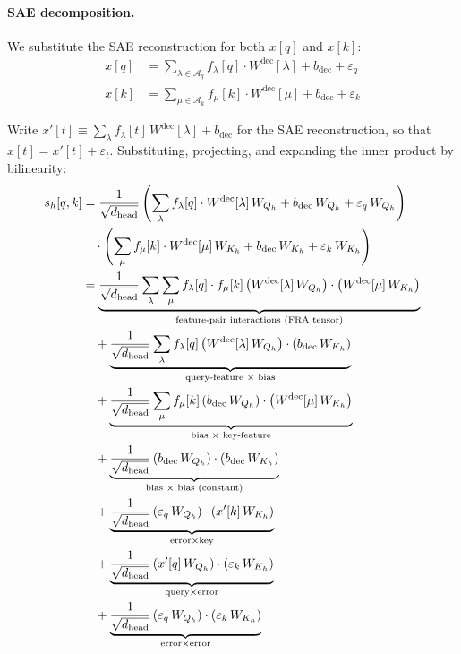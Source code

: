 \documentclass{article} %
\theoremstyle{plain}
\theoremstyle{definition}
\theoremstyle{remark}
\newcommand{\Wdec}{W^{\mathrm{dec}}}
\newcommand{\dhead}{d_{\mathrm{head}}}
\newcommand{\flambda}{f_\lambda}
\newcommand{\fmu}{f_\mu}
\begin{document}
\paragraph{SAE decomposition.} We substitute the SAE reconstruction for both $x[q]$ and $x[k]$:
\begin{align}
    x[q] &= \sum_{\lambda \in \mathcal{A}_q} \flambda[q] \cdot \Wdec[\lambda] + b_{\mathrm{dec}} + \varepsilon_q \\
    x[k] &= \sum_{\mu \in \mathcal{A}_k} \fmu[k] \cdot \Wdec[\mu] + b_{\mathrm{dec}} + \varepsilon_k
\end{align}

Write $x'[t] \equiv \sum_\lambda \flambda[t]\,\Wdec[\lambda] + b_{\mathrm{dec}}$ for the SAE reconstruction, so that $x[t] = x'[t] + \varepsilon_t$. Substituting, projecting, and expanding the inner product by bilinearity:
\begin{align}
    s_h[q,k] &= \frac{1}{\sqrt{\dhead}} \left( \sum_\lambda \flambda[q] \cdot \Wdec[\lambda]\,W_{Q_h} + b_{\mathrm{dec}}\,W_{Q_h} + \varepsilon_q\,W_{Q_h} \right) \notag\\
    &\quad \cdot \left( \sum_\mu \fmu[k] \cdot \Wdec[\mu]\,W_{K_h} + b_{\mathrm{dec}}\,W_{K_h} + \varepsilon_k\,W_{K_h} \right) \\
    &= \underbrace{\frac{1}{\sqrt{\dhead}} \sum_\lambda \sum_\mu \flambda[q] \cdot \fmu[k] \left( \Wdec[\lambda]\,W_{Q_h} \right) \cdot \left( \Wdec[\mu]\,W_{K_h} \right)}_{\text{feature-pair interactions (FRA tensor)}} \label{eq:app_fra_main} \\
    &\quad + \underbrace{\frac{1}{\sqrt{\dhead}} \sum_\lambda \flambda[q] \left( \Wdec[\lambda]\,W_{Q_h} \right) \cdot \left( b_{\mathrm{dec}}\,W_{K_h} \right)}_{\text{query-feature $\times$ bias}} \label{eq:app_qbias} \\
    &\quad + \underbrace{\frac{1}{\sqrt{\dhead}} \sum_\mu \fmu[k] \left( b_{\mathrm{dec}}\,W_{Q_h} \right) \cdot \left( \Wdec[\mu]\,W_{K_h} \right)}_{\text{bias $\times$ key-feature}} \label{eq:app_kbias} \\
    &\quad + \underbrace{\frac{1}{\sqrt{\dhead}} \left( b_{\mathrm{dec}}\,W_{Q_h} \right) \cdot \left( b_{\mathrm{dec}}\,W_{K_h} \right)}_{\text{bias $\times$ bias (constant)}} \label{eq:app_constbias} \\
    &\quad + \underbrace{\frac{1}{\sqrt{\dhead}} \left( \varepsilon_q\,W_{Q_h} \right) \cdot \left( x'[k]\,W_{K_h} \right)}_{\text{error} \times \text{key}} \label{eq:app_errkey} \\
    &\quad + \underbrace{\frac{1}{\sqrt{\dhead}} \left( x'[q]\,W_{Q_h} \right) \cdot \left( \varepsilon_k\,W_{K_h} \right)}_{\text{query} \times \text{error}} \label{eq:app_qerr} \\
    &\quad + \underbrace{\frac{1}{\sqrt{\dhead}} \left( \varepsilon_q\,W_{Q_h} \right) \cdot \left( \varepsilon_k\,W_{K_h} \right)}_{\text{error} \times \text{error}} \label{eq:app_errerr}
\end{align}
\end{document}

